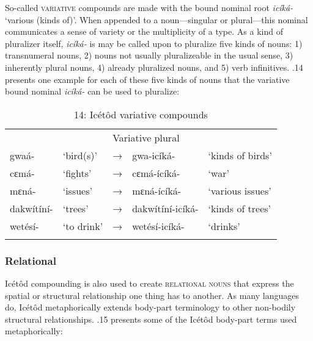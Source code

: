 So-called \textsc{variative} compounds are made with the bound nominal root \textit{icíká-} ‘various (kinds of)’. When appended to a noun—singular or plural—this nominal communicates a sense of variety or the multiplicity of a type. As a kind of pluralizer itself, \textit{icíká- }is may be called upon to pluralize five kinds of nouns: 1) transnumeral nouns, 2) nouns not usually pluralizeable in the usual sense, 3) inherently plural nouns, 4) already pluralized nouns, and 5) verb infinitives. .14 presents one example for each of these five kinds of nouns that the variative bound nominal \textit{icíká- }can be used to pluralize:


\begin{table}
\caption{14: Icétôd variative compounds}
\label{tab:4}


\begin{tabularx}{\textwidth}{XXXXX}
\lsptoprule

\multicolumn{2}{X}{Singular/Plural} &  & \multicolumn{2}{X}{Variative plural}\\
gwaá- & ‘bird(s)’ & → & gwa-icíká- & ‘kinds of birds’\\
cɛmá- & ‘fights’ & → & cɛmá-ícíká- & ‘war’\\
mɛná- & ‘issues’ & → & mɛná-ícíká- & ‘various issues’\\
dakwítíní- & ‘trees’ & → & dakwítíní-icíká- & ‘kinds of trees’\\
wetésí- & ‘to drink’ & → & wetésí-icíká- & ‘drinks’\\
\lspbottomrule
\end{tabularx}
\end{table}

\subsubsection{Relational }

Icétôd compounding is also used to create \textsc{relational nouns} that express the spatial or structural relationship one thing has to another. As many languages do, Icétôd metaphorically extends body-part terminology to other non-bodily structural relationships. .15 presents some of the Icétôd body-part terms used metaphorically:


